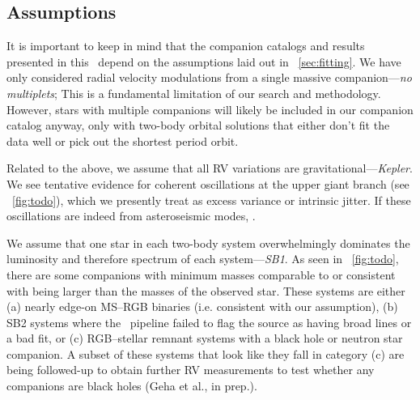 \documentclass[modern, letterpaper]{aastex62}
\newcommand{\apogee}{\project{\acronym{APOGEE}}}
\begin{document}

\subsection{Assumptions}
\label{sec:discuss-assumptions}

It is important to keep in mind that the companion catalogs and results
presented in this \documentname\ depend on the assumptions laid out in
\sectionname~\ref{sec:fitting}.
We have only considered radial velocity modulations from a single massive
companion---\emph{no multiplets}; This is a fundamental limitation of our search
and methodology.
However, stars with multiple companions will likely be included in our companion
catalog anyway, only with two-body orbital solutions that either don't fit the
data well or pick out the shortest period orbit.

Related to the above, we assume that all RV variations are
gravitational---\emph{Kepler}.
We see tentative evidence for coherent oscillations at the upper giant branch
(see \figurename~\ref{fig:todo}), which we presently treat as excess variance or
intrinsic jitter.
If these oscillations are indeed from asteroseismic modes, .

We assume that one star in each two-body system overwhelmingly dominates the
luminosity and therefore spectrum of each system---\emph{SB1}.
As seen in \figurename~\ref{fig:todo}, there are some companions with minimum
masses comparable to or consistent with being larger than the masses of the
observed star.
These systems are either (a) nearly edge-on MS--RGB binaries (i.e. consistent
with our assumption), (b) SB2 systems where the \apogee\ pipeline failed to flag
the source as having broad lines or a bad fit, or (c) RGB--stellar remnant
systems with a black hole or neutron star companion.
A subset of these systems that look like they fall in category (c) are being
followed-up to obtain further RV measurements to test whether any companions are
black holes (Geha et al., in prep.).
\end{document}
